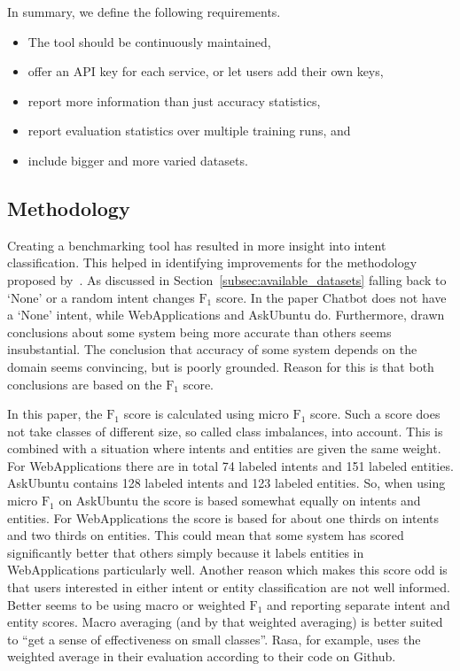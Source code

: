 In summary, we define the following requirements.
\begin{itemize}
    \item The tool should be continuously maintained,
    \item offer an API key for each service, or let users add their own keys,
    \item report more information than just accuracy statistics,
    \item report evaluation statistics over multiple training runs, \hspace*{3mm} and
    \item include bigger and more varied datasets.
\end{itemize}

\subsection{Methodology}
\label{subsec:methodology}
Creating a benchmarking tool has resulted in more insight into intent classification.
This helped in identifying improvements for the methodology proposed by~\citet{braun2017}.
As discussed in Section~\ref{subsec:available_datasets} falling back to `None' or a random intent changes $\text{F}_1$ score.
In the paper Chatbot does not have a `None' intent, while WebApplications and AskUbuntu do.
Furthermore, drawn conclusions about some system being more accurate than others seems insubstantial.
The conclusion that accuracy of some system depends on the domain seems convincing, but is poorly grounded.
Reason for this is that both conclusions are based on the $\text{F}_1$ score.

In this paper, the $\text{F}_1$ score is calculated using micro $\text{F}_1$ score.
Such a score does not take classes of different size, so called class imbalances, into account.
This is combined with a situation where intents and entities are given the same weight.
For WebApplications there are in total 74 labeled intents and 151 labeled entities.
AskUbuntu contains 128 labeled intents and 123 labeled entities.
So, when using micro $\text{F}_1$ on AskUbuntu the score is based somewhat equally on intents and entities.
For WebApplications the score is based for about one thirds on intents and two thirds on entities.
This could mean that some system has scored significantly better that others simply because it labels entities in WebApplications particularly well.
Another reason which makes this score odd is that users interested in either intent or entity classification are not well informed.
Better seems to be using macro or weighted $\text{F}_1$ and reporting separate intent and entity scores.
Macro averaging (and by that weighted averaging) is better suited to ``get a sense of effectiveness on small classes''\citep{schutze2008introduction}.
Rasa, for example, uses the weighted average in their evaluation according to their code on Github.

